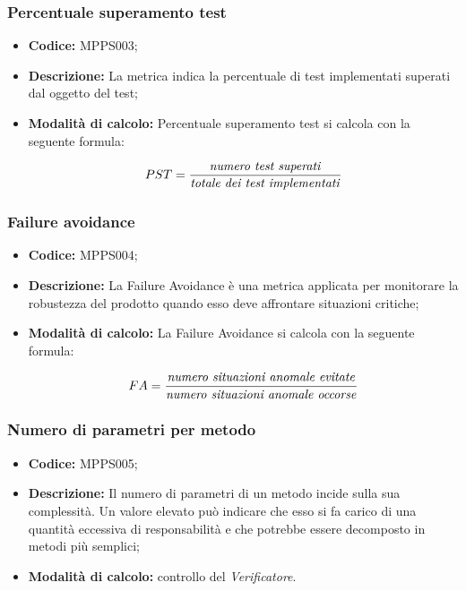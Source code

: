 \documentclass[../NormediProgetto.tex]{subfiles}
\begin{document}
\subsubsection{Percentuale superamento test}

\begin{itemize}
	\item \textbf{Codice:} MPPS003;
	\item \textbf{Descrizione:} La metrica indica la percentuale di test implementati superati dal oggetto del test;
	\item \textbf{Modalità di calcolo:} Percentuale superamento test si calcola con la seguente formula:
	
	\[ PST = \frac{\textrm{\textit{numero test superati}}}{\textrm{\textit{totale dei test implementati}}} \]
\end{itemize}

\subsubsection{Failure avoidance}

\begin{itemize}
	\item \textbf{Codice:} MPPS004;
	\item \textbf{Descrizione:} La Failure Avoidance è una metrica applicata per monitorare la robustezza del prodotto quando esso deve affrontare situazioni critiche;
	\item \textbf{Modalità di calcolo:} La Failure Avoidance si calcola con la seguente formula:
	
	\[ FA = \frac{\textrm{\textit{numero situazioni anomale evitate}}}{\textrm{\textit{numero situazioni anomale occorse}}} \]
\end{itemize}

\subsubsection{Numero di parametri per metodo}

\begin{itemize}
	\item \textbf{Codice:} MPPS005;
	
	\item \textbf{Descrizione:} Il numero di parametri di un metodo incide sulla sua complessità. Un valore elevato può indicare che esso si fa carico di una quantità eccessiva di responsabilità e che potrebbe essere decomposto in metodi più semplici;
	
	\item \textbf{Modalità di calcolo:} controllo del \textit{Verificatore}.
\end{itemize}
\end{document}
